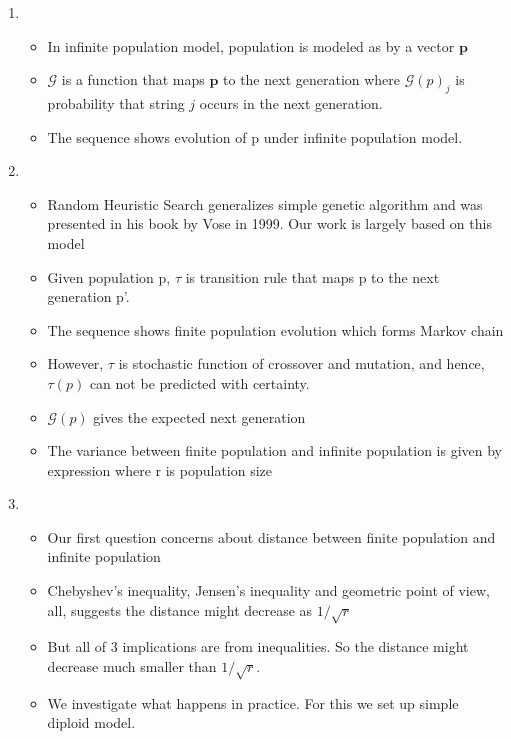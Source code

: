 \documentclass{article}
\begin{document}
\begin{enumerate}
\item
  \begin{itemize}
  \item In infinite population model, population is modeled as by a vector $\bm{p}$
        
  \item $\mathcal{G}$ is a function that maps $\bm{p}$ to the next
    generation where $\mathcal{G}(p)_j$ is probability that string $j$
    occurs in the next generation.
  \item The sequence shows evolution of p under infinite population
    model.
  \end{itemize}
  
\item
  \begin{itemize}
  \item Random Heuristic Search generalizes simple genetic algorithm and was presented in his book by Vose in 1999. Our work is
    largely based on this model
  \item Given population p, $\tau$ is transition rule that maps p to
    the next generation p'.
  \item The sequence shows finite population evolution which forms
    Markov chain
  \item However, $\tau$ is stochastic function of crossover and
    mutation, and hence, $\tau(p)$ can not be predicted with
    certainty.
  \item $\mathcal{G}(p)$ gives the expected next generation
  \item The variance between finite population and infinite population
    is given by expression where r is population size
  \end{itemize}

\item
  \begin{itemize}
  \item Our first question concerns about distance between finite
    population and infinite population
  \item Chebyshev's inequality, Jensen's inequality and geometric point of view, all, suggests the distance might decrease
    as $1/\sqrt{ r}$
  \item But all of 3 implications are from inequalities. So the distance
    might decrease much smaller than $1/\sqrt{ r}$.
  \item We investigate what happens in practice. For this we set up
    simple diploid model.
  \end{itemize}
    

\end{enumerate}
\end{document}
